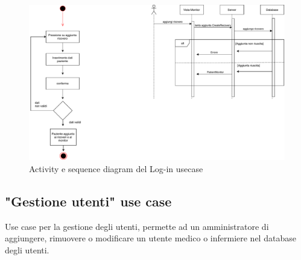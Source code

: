 \documentclass{article}
\begin{document}
\vspace{2cm}


\begin{figure}[H]

		\includegraphics[width=1.1\textwidth]{documenti/Activity_Sequence_diagram_Ricovero.pdf}
		\caption{Activity e sequence diagram del Log-in usecase}
		\label{Activity_Sequence_diagram_Login}

	\end{figure}


\vspace{2cm}



\subsection{"Gestione utenti" use case}

Use case per la gestione degli utenti, permette ad un amministratore di aggiungere, rimuovere o modificare un utente medico o infermiere nel database degli utenti.

\vspace{1cm}
\end{document}
